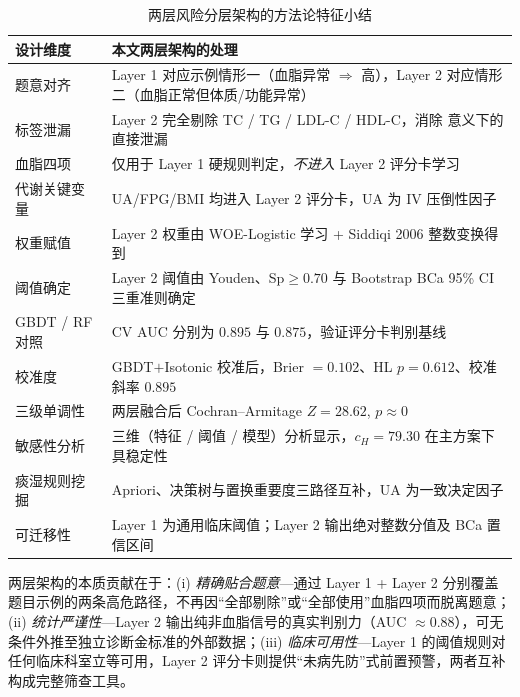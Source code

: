 \documentclass{MathorCupmodeling}
\renewcommand{\arraystretch}{1.15}
\begin{document}
\begin{table}[H]
\centering\footnotesize
\caption{两层风险分层架构的方法论特征小结}\label{tab:q2-compare}

\setlength{\tabcolsep}{3pt}
\renewcommand{\arraystretch}{1.08}
\begin{tabularx}{0.98\textwidth}{@{}>{\raggedright\arraybackslash}p{} L@{}}
\toprule
设计维度 & 本文两层架构的处理 \\
\midrule
题意对齐 & Layer 1 对应示例情形一（血脂异常 $\Rightarrow$ 高），Layer 2 对应情形二（血脂正常但体质/功能异常） \\
标签泄漏 & Layer 2 完全剔除 TC / TG / LDL-C / HDL-C，消除 \cite{kaufman2012leakage} 意义下的直接泄漏 \\
血脂四项 & 仅用于 Layer 1 硬规则判定，\emph{不进入} Layer 2 评分卡学习 \\
代谢关键变量 & UA/FPG/BMI 均进入 Layer 2 评分卡，UA 为 IV 压倒性因子 \\
权重赋值 & Layer 2 权重由 WOE-Logistic 学习 + Siddiqi 2006 整数变换得到 \\
阈值确定 & Layer 2 阈值由 Youden、Sp$\ge 0.70$ 与 Bootstrap BCa 95\% CI 三重准则确定 \\
GBDT / RF 对照 & CV AUC 分别为 $0.895$ 与 $0.875$，验证评分卡判别基线 \\
校准度 & GBDT$+$Isotonic 校准后，Brier $=0.102$、HL $p=0.612$、校准斜率 $0.895$ \\
三级单调性 & 两层融合后 Cochran--Armitage $Z=28.62$, $p\approx 0$ \\
敏感性分析 & 三维（特征 / 阈值 / 模型）分析显示，$c_H=79.30$ 在主方案下具稳定性 \\
痰湿规则挖掘 & Apriori、决策树与置换重要度三路径互补，UA 为一致决定因子 \\
可迁移性 & Layer 1 为通用临床阈值；Layer 2 输出绝对整数分值及 BCa 置信区间 \\
\bottomrule
\end{tabularx}

\end{table}

两层架构的本质贡献在于：(i) \emph{精确贴合题意}---通过 Layer 1 + Layer 2 分别覆盖题目示例的两条高危路径，不再因``全部剔除''或``全部使用''血脂四项而脱离题意；(ii) \emph{统计严谨性}---Layer 2 输出纯非血脂信号的真实判别力（AUC $\approx 0.88$），可无条件外推至独立诊断金标准的外部数据；(iii) \emph{临床可用性}---Layer 1 的阈值规则对任何临床科室立等可用，Layer 2 评分卡则提供``未病先防''式前置预警，两者互补构成完整筛查工具。
\end{document}
